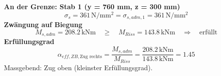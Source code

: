 \documentclass[11pt,a4paper]{article}
\begin{document}
\noindent\textbf{An der Grenze: Stab 1 (y = 760 mm, z = 300 mm)}
\begin{equation*}
\sigma_s = 361\,\mathrm{N}/\mathrm{mm}^{2} = \sigma_{s,adm,1} = 361\,\mathrm{N}/\mathrm{mm}^{2}
\end{equation*}
\noindent\textbf{Zwängung auf Biegung}
\begin{equation*}
M_{s,adm} = 208.2\,\mathrm{kNm} \quad \ge \quad M_{Riss} = 143.8\,\mathrm{kNm} \quad \Rightarrow \quad \text{erfüllt}
\end{equation*}
\noindent\textbf{Erfüllungsgrad}
\begin{equation*}
\alpha_{eff,ZB,\text{Zug rechts}} = \frac{M_{s,adm}}{M_{Riss}} = \frac{208.2\,\mathrm{kNm}}{143.8\,\mathrm{kNm}} = 1.45
\end{equation*}
Massgebend: Zug oben (kleinster Erfüllungsgrad).
\end{document}
